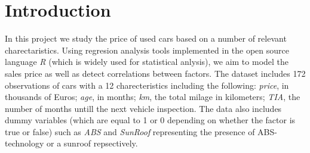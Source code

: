 \section{Introduction}

In this project we study the price of used cars based on a number of relevant charectaristics. Using regresion analysis tools implemented in the open source language \textit{R} (which is widely used for statistical anlysis), we aim to model the sales price as well as detect correlations between factors. The dataset includes 172 observations of cars with a 12 charecteristics including the following: \textit{price}, in thousands of Euros; \textit{age}, in months; \textit{km}, the total milage in kilometers; \textit{TIA}, the number of months untill the next vehicle inspection. The data also includes dummy variables (which are equal to 1 or 0 depending on whether the factor is true or false) such as \textit{ABS} and \textit{SunRoof} representing the presence of ABS-technology or a sunroof repsectively.